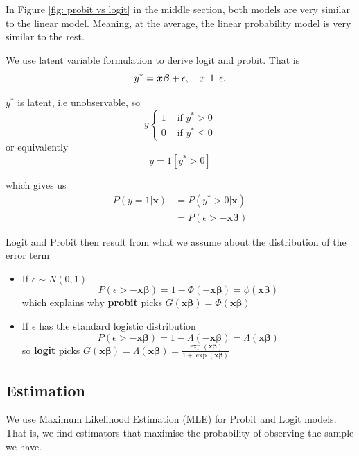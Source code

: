 \documentclass[11pt]{article}
\begin{document}
\begin{note}
    In Figure \ref{fig: probit vs logit} in the middle section, both models are very similar to the linear model. Meaning, at the average, the linear probability model is very similar to the rest.
\end{note}


\begin{procedure}
    We use latent variable formulation to derive logit and probit. That is
    \[y^* = \boldsymbol{x\beta} + \epsilon, \quad x \indep \epsilon.\]

    $y^*$ is latent, i.e unobservable, so
    \[y \begin{cases}
        1 & \text{ if } y^*>0 \\
        0 & \text{ if } y^* \leq 0
    \end{cases}\]
    or equivalently
    \[y = 1[y^*>0]\]

    which gives us
    \begin{align*}
        P(y=1|\boldsymbol{x}) &= P(y^*>0|\boldsymbol{x}) \\
        &= P(\epsilon> - \boldsymbol{x\beta})
    \end{align*}

    
\end{procedure}

Logit and Probit then result from what we assume about the distribution of the error term
    \begin{itemize}
        \item If $\epsilon \sim N(0,1)$ 
        \[P(\epsilon > - \boldsymbol{x\beta}) = 1 - \Phi (-\boldsymbol{x\beta}) = \phi(\boldsymbol{x\beta})\]
        which explains why \textbf{probit} picks $G(\boldsymbol{x\beta}) = \Phi( \boldsymbol{x\beta})$
        \item If $\epsilon$ has the standard logistic distribution
        \[P(\epsilon > - \boldsymbol{x\beta}) = 1- \Lambda (- \boldsymbol{x\beta}) = \Lambda(\boldsymbol{x\beta})\]
        so \textbf{logit} picks $G(\boldsymbol{x\beta}) = \Lambda(\boldsymbol{x\beta}) = \frac{\exp{(\boldsymbol{x\beta})}}{1 + \exp{(\boldsymbol{x\beta})}}$
    \end{itemize}


\subsection{Estimation}

We use Maximum Likelihood Estimation (MLE) for Probit and Logit models. That is, we find estimators that maximise the probability of observing the sample we have.
\end{document}
